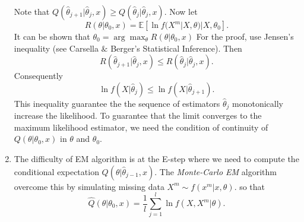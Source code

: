 \documentclass[12pt,twocolumn]{article} %
\begin{document}
\begin{enumerate}
Note that $Q(\hat \theta_{j+1}|\hat \theta_j,x) \geq Q(\hat \theta_j|\hat \theta_j,x)$. Now let 
$$R(\theta|\theta_0,x) = 
\mathbb{E} [\ln f(X^m|X,\theta)|X,\theta_0].$$
It can be shown that $\theta_0 = \arg \max_{\theta} R(\theta|\theta_0,x)$ For the proof, use Jensen's inequality (see Carsella $\&$ Berger's  Statistical Inference). Then
$$ R(\hat \theta_{j+1}|\hat \theta_j,x) \leq R(\hat \theta_j|\hat \theta_j,x).$$
Consequently
$$\ln f(X|\hat \theta_j) \leq \ln f(X|\hat \theta_{j+1}).$$
This inequality guarantee the the sequence of estimators $\hat \theta_j$ monotonically increase the likelihood. To guarantee that the limit converges to the maximum likelihood estimator, we need the condition of continuity of $Q(\theta|\theta_0,x)$ in $\theta$ and $\theta_0$.


\item The difficulty of EM algorithm is at the E-step where we need to compute the conditional expectation $Q(\theta|\hat \theta_{j-1},x)$. The {\em Monte-Carlo EM} algorithm overcome this by simulating missing data $X^m \sim f(x^m|x,\theta)$. 
so that $$\widehat Q(\theta|\theta_0,x) = \frac{1}{l}\sum_{j=1}^l \ln f(X,X^m|\theta).$$
\end{enumerate}
\end{document}
